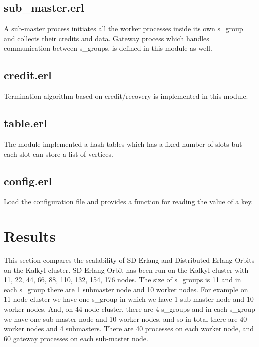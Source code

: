 \documentclass[11pt,a4paper]{article}
\begin{document}
\subsection*{sub\_master.erl}
A sub-master process initiates all the worker processes inside its own s\_group and collects their credits and data. Gateway process which handles communication between s\_groups, is defined in this module as well.

\subsection*{credit.erl}
Termination algorithm based on credit/recovery is implemented in this module. 

\subsection*{table.erl}
The module implemented a hash tables which has a fixed number of slots but each slot can store a list of vertices. 

\subsection*{config.erl}
Load the configuration file and provides a function for reading the value of a key. 

\section{Results}
This section compares the scalability of SD Erlang and Distributed Erlang Orbits on the Kalkyl cluster. SD Erlang Orbit has been run on the Kalkyl cluster with 11, 22, 44, 66, 88, 110, 132, 154,  176 nodes. The size of s\_groups is 11 and in each s\_group there are 1 submaster node and 10 worker nodes. For example on 11-node cluster we have one s\_group in which we have 1 sub-master node and 10 worker nodes. And, on 44-node cluster, there are 4 s\_groups and in each s\_group we have one sub-master node and 10 worker nodes, and so in total there are 40 worker nodes and 4 submasters.
There are 40 processes on each worker node, and 60 gateway processes on each sub-master node.
\end{document}
